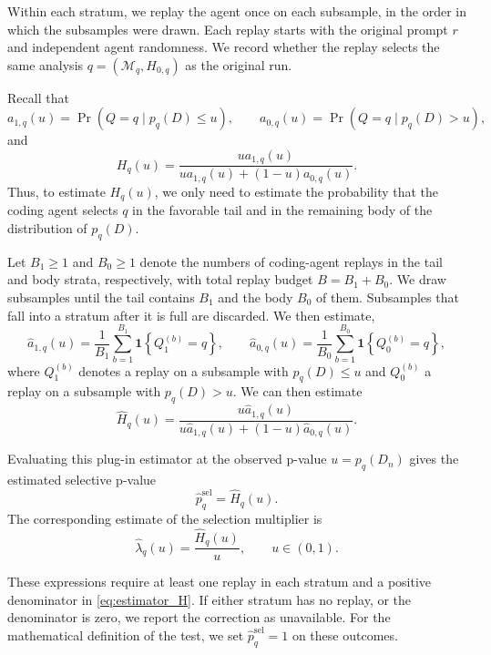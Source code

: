 \documentclass[10pt]{article}
\begin{document}
Within each stratum, we replay the agent once on each subsample, in the order in which the subsamples were drawn. Each replay starts with the original prompt $r$ and independent agent randomness. We record whether the replay selects the same analysis $q=(\mathcal M_q,H_{0,q})$ as the original run.

Recall that
\[
a_{1,q}(u)
=
\Pr\!\left(
Q=q
\mid
p_q(D)\leq u
\right),
\qquad
a_{0,q}(u)
=
\Pr\!\left(
Q=q
\mid
p_q(D)>u
\right),
\]
and
\[
H_q(u)
=
\frac{
u a_{1,q}(u)
}{
u a_{1,q}(u)+(1-u)a_{0,q}(u)
}.
\]
Thus, to estimate $H_q(u)$, we only need to estimate the probability that the coding agent selects $q$ in the favorable tail and in the remaining body of the distribution of $p_q(D)$.

Let $B_1\geq1$ and $B_0\geq1$ denote the numbers of coding-agent replays in the tail and body strata, respectively, with total replay budget $B=B_1+B_0$. We draw subsamples until the tail contains $B_1$ and the body $B_0$ of them. Subsamples that fall into a stratum after it is full are discarded. We then estimate,
\begin{equation} \label{eq:a_1_a_0}
\widehat a_{1,q}(u)
=
\frac{1}{B_1}
\sum_{b=1}^{B_1}
\mathbf{1}\left\{Q_1^{(b)}=q\right\},
\qquad
\widehat a_{0,q}(u)
=
\frac{1}{B_0}
\sum_{b=1}^{B_0}
\mathbf{1}\left\{Q_0^{(b)}=q\right\},
\end{equation}
where $Q_1^{(b)}$ denotes a replay on a subsample with $p_q(D)\leq u$ and $Q_0^{(b)}$ a replay on a subsample with $p_q(D)>u$. We can then estimate
\begin{equation}
\label{eq:estimator_H}
\widehat H_q(u)
=
\frac{
u\widehat a_{1,q}(u)
}{
u\widehat a_{1,q}(u)
+
(1-u)\widehat a_{0,q}(u)
}.
\end{equation}

Evaluating this plug-in estimator at the observed p-value $u=p_q(D_n)$ gives the estimated selective p-value
\[
\widehat p_q^{\mathrm{sel}}
=
\widehat H_q(u).
\]
The corresponding estimate of the selection multiplier is
\begin{equation}\label{eq:estimator_lambda}
\widehat\lambda_q(u)
=
\frac{\widehat H_q(u)}{u},
\qquad u\in(0,1).
\end{equation}

These expressions require at least one replay in each stratum and a positive denominator in \eqref{eq:estimator_H}. If either stratum has no replay, or the denominator is zero, we report the correction as unavailable. For the mathematical definition of the test, we set $\widehat p_q^{\mathrm{sel}}=1$ on these outcomes.
\end{document}
